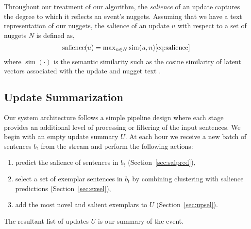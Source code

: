 Throughout our treatment of our algorithm, the \emph{salience} 
of an update captures the degree to which it reflects an 
event's nuggets.  Assuming that we have a text representation 
of our nuggets, the salience of an update $u$  with respect to a set of nuggets $N$ is
defined as,
\begin{align}
\operatorname{salience}(u) = \operatorname{max}_{n \in N} 
\operatorname{sim}(u, n) \ref{eq:salience}
\end{align}
where $\operatorname{sim}(\cdot)$ is the semantic similarity such as
the cosine similarity of latent vectors associated with the update and 
nugget text \cite{?}. %



\subsection{Update Summarization}

Our system architecture follows a simple pipeline design where each
stage provides an additional level of processing or filtering of the input
sentences.
We begin with an empty update summary $U$.
At each hour we receive a new batch of sentences $b_t$ from the stream
and perform the following actions:
\begin{enumerate}
    \item predict the salience of sentences in $b_t$ (Section~\ref{sec:salpred}),
  \item select a set of exemplar sentences  in $b_t$ by combining clustering with 
      salience predictions (Section~\ref{sec:exsel}),
  \item add the most novel and salient exemplars to $U$ (Section~\ref{sec:upsel}).
\end{enumerate}

The resultant list of updates $U$ is our summary of the event.



